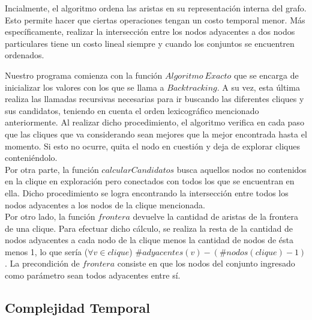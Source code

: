 Incialmente, el algoritmo ordena las aristas en su representación interna del grafo. Esto permite hacer que ciertas operaciones tengan un costo temporal menor. Más específicamente, realizar la intersección entre los nodos adyacentes a dos nodos particulares tiene un costo lineal siempre y cuando los conjuntos se encuentren ordenados.

Nuestro programa comienza con la función $Algoritmo\ Exacto$ que se encarga de inicializar los valores con los que se llama a $Backtracking$. A su vez, esta última realiza las llamadas recursivas necesarias para ir buscando las diferentes cliques y sus candidatos, teniendo en cuenta el orden lexicográfico mencionado anteriormente. Al realizar dicho procedimiento, el algoritmo verifica en cada paso que las cliques que va considerando sean mejores que la mejor encontrada hasta el momento. Si esto no ocurre, quita el nodo en cuestión y deja de explorar cliques conteniéndolo.\\
\newline
Por otra parte, la función $calcularCandidatos$ busca aquellos nodos no contenidos en la clique en exploración pero conectados con todos los que se encuentran en ella. Dicho procedimiento se logra encontrando la intersección entre todos los nodos adyacentes a los nodos de la clique mencionada.\\
\newline
Por otro lado, la función $frontera$ devuelve la cantidad de aristas de la frontera de una clique. Para efectuar dicho cálculo, se realiza la resta de la cantidad de nodos adyacentes a cada nodo de la clique menos la cantidad de nodos de ésta menos 1, lo que sería ($\forall v \in clique$) $\#adyacentes(v)-(\#nodos(clique)-1)$. La precondición de $frontera$ consiste en que los nodos del conjunto ingresado como parámetro sean todos adyacentes entre sí.

\subsection{Complejidad Temporal}

